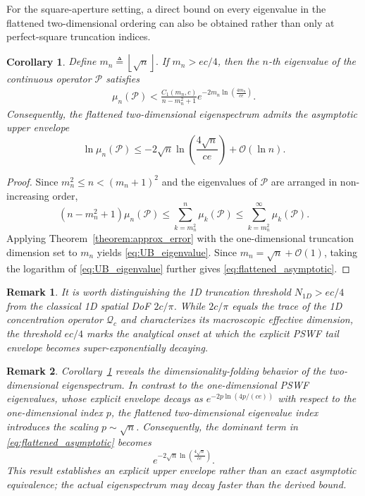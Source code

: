 \documentclass[lettersize,journal]{IEEEtran}
\theoremstyle{plain}
\newtheorem{remark}{Remark}
\newtheorem{corollary}{Corollary}
\begin{document}
For the square-aperture setting, a direct bound on every eigenvalue in the flattened two-dimensional ordering can also be obtained rather than only at perfect-square truncation indices.
\begin{corollary}
	\label{corollary:eigenspectrum_decay}
	Define $m_n \triangleq \left\lfloor\sqrt{n}\right\rfloor.$
	If $m_n>ec/4$, then the $n$-th eigenvalue of the continuous
	operator $\mathcal{P}$ satisfies
	\begin{align}
		\mu_n(\mathcal{P})
		<
		\frac{C_1(m_n,c)}
		{n-m_n^2+1}
		e^{-2m_n
			\ln\left(\frac{4m_n}{ce}\right)}.
		\label{eq:UB_eigenvalue}
	\end{align}
	Consequently, the flattened two-dimensional eigenspectrum
	admits the asymptotic upper envelope
	\begin{equation}
		\ln\mu_n(\mathcal{P})
		\leq
		-2\sqrt{n}
		\ln\left(\frac{4\sqrt{n}}{ce}\right)
		+\mathcal{O}(\ln n).
		\label{eq:flattened_asymptotic}
	\end{equation}
\end{corollary}
\begin{proof}
	Since $m_n^2\leq n<(m_n+1)^2$ and the eigenvalues of
	$\mathcal{P}$ are arranged in non-increasing order,
	$$
		(n-m_n^2+1)\mu_n(\mathcal{P})
		\leq
		\sum_{k=m_n^2}^{n}\mu_k(\mathcal{P})\leq
		\sum_{k=m_n^2}^{\infty}\mu_k(\mathcal{P}).
	$$
	Applying Theorem~\ref{theorem:approx_error} with the
	one-dimensional truncation dimension set to $m_n$ yields
	\eqref{eq:UB_eigenvalue}. Since
	$m_n=\sqrt{n}+\mathcal{O}(1)$, taking the logarithm of
	\eqref{eq:UB_eigenvalue} further gives
	\eqref{eq:flattened_asymptotic}.
\end{proof}

\begin{remark}
	\label{remark:perturbation_tail_error}
	It is worth distinguishing the 1D truncation threshold
	$N_{1D}>ec/4$ from the classical 1D spatial DoF $2c/\pi$. While $2c/\pi$ equals
	the trace of the 1D concentration operator $\mathcal{Q}_c$
	and characterizes its macroscopic effective dimension, the
	threshold $ec/4$ marks the analytical onset at which the
	explicit PSWF tail envelope becomes super-exponentially
	decaying.
\end{remark}

\begin{remark}
	\label{remark:decaying_rate}
	Corollary~\ref{corollary:eigenspectrum_decay} reveals the
	dimensionality-folding behavior of the two-dimensional
	eigenspectrum. In contrast to the one-dimensional PSWF
	eigenvalues, whose explicit envelope decays as
	$e^{-2p\ln(4p/(ce))}$ with respect to the one-dimensional
	index $p$, the flattened two-dimensional eigenvalue index
	introduces the scaling $p\sim\sqrt{n}$. Consequently, the
	dominant term in \eqref{eq:flattened_asymptotic} becomes
	$$
		e^{-2\sqrt{n}
			\ln\left(\frac{4\sqrt{n}}{ce}\right)}.
	$$
	This result establishes an explicit upper envelope rather than
	an exact asymptotic equivalence; the actual eigenspectrum may
	decay faster than the derived bound.
\end{remark}
\end{document}
